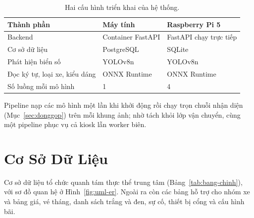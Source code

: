 \begin{table}[htbp]
\centering
\caption{Hai cấu hình triển khai của hệ thống.}
\label{tab:cauhinh-trienkhai}

\vspace{4pt}
\begin{tabular}{lll}
\toprule
\textbf{Thành phần} & \textbf{Máy tính} & \textbf{Raspberry Pi 5} \\
\midrule
Backend & Container FastAPI & FastAPI chạy trực tiếp \\
Cơ sở dữ liệu & PostgreSQL & SQLite \\
Phát hiện biển số & YOLOv8n & YOLOv8n \\
Đọc ký tự, loại xe, kiểu dáng & ONNX Runtime & ONNX Runtime \\
Số luồng mỗi mô hình & 1 & 4 \\
\bottomrule
\end{tabular}
\end{table}

Pipeline nạp các mô hình một lần khi khởi động rồi chạy trọn chuỗi nhận diện
(Mục~\ref{sec:donggop}) trên mỗi khung ảnh; nhờ tách khỏi lớp vận chuyển, cùng một pipeline
phục vụ cả kiosk lẫn worker biên.

\section{Cơ Sở Dữ Liệu}
\label{sec:csdl}

Cơ sở dữ liệu tổ chức quanh tám thực thể trung tâm (Bảng~\ref{tab:bang-chinh}), với sơ đồ
quan hệ ở Hình~\ref{fig:uml-er}. Ngoài ra còn các bảng hỗ trợ cho nhóm xe và bảng giá, vé
tháng, danh sách trắng và đen, sự cố, thiết bị cổng và cấu hình bãi.

